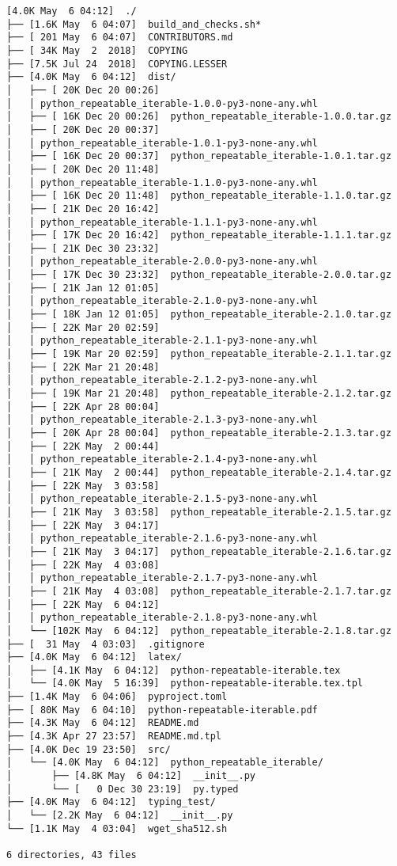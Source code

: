 \documentclass{article}
\begin{document}
\begin{verbatim}
[4.0K May  6 04:12]  ./
├── [1.6K May  6 04:07]  build_and_checks.sh*
├── [ 201 May  6 04:07]  CONTRIBUTORS.md
├── [ 34K May  2  2018]  COPYING
├── [7.5K Jul 24  2018]  COPYING.LESSER
├── [4.0K May  6 04:12]  dist/
│   ├── [ 20K Dec 20 00:26]
│   │ python_repeatable_iterable-1.0.0-py3-none-any.whl
│   ├── [ 16K Dec 20 00:26]  python_repeatable_iterable-1.0.0.tar.gz
│   ├── [ 20K Dec 20 00:37]
│   │ python_repeatable_iterable-1.0.1-py3-none-any.whl
│   ├── [ 16K Dec 20 00:37]  python_repeatable_iterable-1.0.1.tar.gz
│   ├── [ 20K Dec 20 11:48]
│   │ python_repeatable_iterable-1.1.0-py3-none-any.whl
│   ├── [ 16K Dec 20 11:48]  python_repeatable_iterable-1.1.0.tar.gz
│   ├── [ 21K Dec 20 16:42]
│   │ python_repeatable_iterable-1.1.1-py3-none-any.whl
│   ├── [ 17K Dec 20 16:42]  python_repeatable_iterable-1.1.1.tar.gz
│   ├── [ 21K Dec 30 23:32]
│   │ python_repeatable_iterable-2.0.0-py3-none-any.whl
│   ├── [ 17K Dec 30 23:32]  python_repeatable_iterable-2.0.0.tar.gz
│   ├── [ 21K Jan 12 01:05]
│   │ python_repeatable_iterable-2.1.0-py3-none-any.whl
│   ├── [ 18K Jan 12 01:05]  python_repeatable_iterable-2.1.0.tar.gz
│   ├── [ 22K Mar 20 02:59]
│   │ python_repeatable_iterable-2.1.1-py3-none-any.whl
│   ├── [ 19K Mar 20 02:59]  python_repeatable_iterable-2.1.1.tar.gz
│   ├── [ 22K Mar 21 20:48]
│   │ python_repeatable_iterable-2.1.2-py3-none-any.whl
│   ├── [ 19K Mar 21 20:48]  python_repeatable_iterable-2.1.2.tar.gz
│   ├── [ 22K Apr 28 00:04]
│   │ python_repeatable_iterable-2.1.3-py3-none-any.whl
│   ├── [ 20K Apr 28 00:04]  python_repeatable_iterable-2.1.3.tar.gz
│   ├── [ 22K May  2 00:44]
│   │ python_repeatable_iterable-2.1.4-py3-none-any.whl
│   ├── [ 21K May  2 00:44]  python_repeatable_iterable-2.1.4.tar.gz
│   ├── [ 22K May  3 03:58]
│   │ python_repeatable_iterable-2.1.5-py3-none-any.whl
│   ├── [ 21K May  3 03:58]  python_repeatable_iterable-2.1.5.tar.gz
│   ├── [ 22K May  3 04:17]
│   │ python_repeatable_iterable-2.1.6-py3-none-any.whl
│   ├── [ 21K May  3 04:17]  python_repeatable_iterable-2.1.6.tar.gz
│   ├── [ 22K May  4 03:08]
│   │ python_repeatable_iterable-2.1.7-py3-none-any.whl
│   ├── [ 21K May  4 03:08]  python_repeatable_iterable-2.1.7.tar.gz
│   ├── [ 22K May  6 04:12]
│   │ python_repeatable_iterable-2.1.8-py3-none-any.whl
│   └── [102K May  6 04:12]  python_repeatable_iterable-2.1.8.tar.gz
├── [  31 May  4 03:03]  .gitignore
├── [4.0K May  6 04:12]  latex/
│   ├── [4.1K May  6 04:12]  python-repeatable-iterable.tex
│   └── [4.0K May  5 16:39]  python-repeatable-iterable.tex.tpl
├── [1.4K May  6 04:06]  pyproject.toml
├── [ 80K May  6 04:10]  python-repeatable-iterable.pdf
├── [4.3K May  6 04:12]  README.md
├── [4.3K Apr 27 23:57]  README.md.tpl
├── [4.0K Dec 19 23:50]  src/
│   └── [4.0K May  6 04:12]  python_repeatable_iterable/
│       ├── [4.8K May  6 04:12]  __init__.py
│       └── [   0 Dec 30 23:19]  py.typed
├── [4.0K May  6 04:12]  typing_test/
│   └── [2.2K May  6 04:12]  __init__.py
└── [1.1K May  4 03:04]  wget_sha512.sh

6 directories, 43 files
\end{verbatim}
\end{document}
